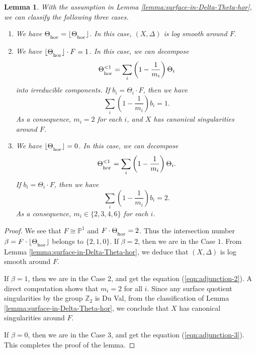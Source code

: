 \documentclass[12pt]{amsart}
\newcommand{\<}{\leq}
\newcommand{\D}{\Delta}
\newtheorem{lemma}[theorem]{Lemma}
\theoremstyle{remark}
\theoremstyle{definition}
\theoremstyle{definition}
\numberwithin{equation}{section}
\theoremstyle{definition}
\theoremstyle{definition}
\def\hor{\operatorname{\hor}}
\def\hor{\operatorname{\textsubscript{\rm hor}}}
\begin{document}
 


\begin{lemma}
\label{lemma:surface-in-Delta-classification}
With the assumption in Lemma \ref{lemma:surface-in-Delta-Theta-hor}, we can classify the following three cases. 

\begin{enumerate}
  \item[1.]   We have $\Theta_{\hor} = \lfloor \Theta_{\hor} \rfloor$. 
In this case, $(X,\D)$ is log smooth around $F$. 

\item[2.]    We have $  \lfloor \Theta_{\hor} \rfloor \cdot F =1$.  
In this case,   we can decompose  
\[\Theta_{\hor}^{<1} = \sum_i \left(1-\frac{1}{m_i}\right) \Theta_i\] 
into irreducible components. 
If $b_i=\Theta_i \cdot F$, then we have 
\begin{equation} \label{eqn:adjunction-2}
     \sum_i \left(1-\frac{1}{m_i}\right)b_i = 1.
\end{equation}   
As a consequence, $m_i=2$ for each $i$, and $X$ has canonical singularities around $F$.

\item[3.]  We have $ \lfloor \Theta_{\hor}\rfloor  =0$. 
   In this case, we can decompose 
   \[\Theta_{\hor}^{<1} = \sum_i \left(1-\frac{1}{m_i}\right) \Theta_i.\] 
   If $b_i=\Theta_i \cdot F$, then we have 
   \begin{equation}\label{eqn:adjunction-3}
       \sum_i \left(1-\frac{1}{m_i}\right)b_i = 2.
   \end{equation}
   As a consequence, $m_i\in \{2,3,4,6\}$ for each $i$. 
\end{enumerate} 
\end{lemma}

\begin{proof}
We see that $F\cong \mathbb{P}^1$ and $F\cdot \Theta_{\hor} = 2$. 
Thus   the intersection number $ \beta = F\cdot \lfloor \Theta_{\hor} \rfloor$ belongs to $\{2,1,0\}$. 
If $\beta = 2$, then we are in the Case $1$. 
From Lemma \ref{lemma:surface-in-Delta-Theta-hor}, we deduce that $(X,\D)$ is log smooth around $F$.  

If $\beta=1$, then we are in the Case 2, and  get the equation (\ref{eqn:adjunction-2}). 
A direct computation shows that $m_i=2$ for all $i$. 
Since any surface quotient singularities by the  group $\mathbb{Z}_2$ is Du Val, from the classification of Lemma \ref{lemma:surface-in-Delta-Theta-hor},  we conclude that $X$ has canonical singularities around $F$. 

If $\beta=0$, then we are in the Case 3, and  get the equation (\ref{eqn:adjunction-3}).  
This completes the proof of the lemma.
\end{proof}
\end{document}
